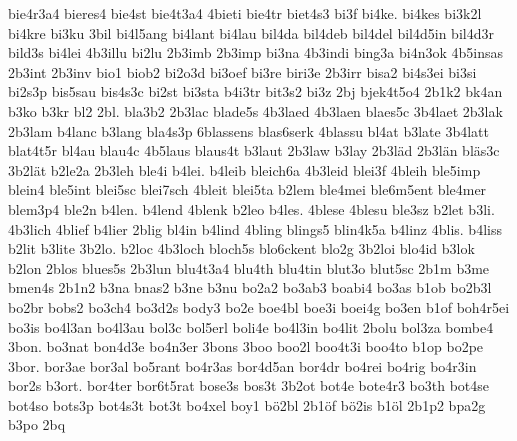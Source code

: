{    bie4r3a4
    bieres4
    bie4st
    bie4t3a4
    4bieti
    bie4tr
    biet4s3
    bi3f
    bi4ke.
    bi4kes
    bi3k2l
    bi4kre
    bi3ku
    3bil
    bi4l5ang
    bi4lant
    bi4lau
    bil4da
    bil4deb
    bil4del
    bil4d5in
    bil4d3r
    bild3s
    bi4lei
    4b3illu
    bi2lu
    2b3imb
    2b3imp
    bi3na
    4b3indi
    bing3a
    bi4n3ok
    4b5insas
    2b3int
    2b3inv
    bio1
    biob2
    bi2o3d
    bi3oef
    bi3re
    biri3e
    2b3irr
    bisa2
    bi4s3ei
    bi3si
    bi2s3p
    bis5sau
    bis4s3c
    bi2st
    bi3sta
    b4i3tr
    bit3s2
    bi3z
    2bj
    bjek4t5o4
    2b1k2
    bk4an
    b3ko
    b3kr
    bl2
    2bl.
    bla3b2
    2b3lac
    blade5s
    4b3laed
    4b3laen
    blaes5c
    3b4laet
    2b3lak
    2b3lam
    b4lanc
    b3lang
    bla4s3p
    6blassens
    blas6serk
    4blassu
    bl4at
    b3late
    3b4latt
    blat4t5r
    bl4au
    blau4c
    4b5laus
    blaus4t
    b3laut
    2b3law
    b3lay
    2b3läd
    2b3län
    bläs3c
    3b2lät
    b2le2a
    2b3leh
    ble4i
    b4lei.
    b4leib
    bleich6a
    4b3leid
    blei3f
    4bleih
    ble5imp
    blein4
    ble5int
    blei5sc
    blei7sch
    4bleit
    blei5ta
    b2lem
    ble4mei
    ble6m5ent
    ble4mer
    blem3p4
    ble2n
    b4len.
    b4lend
    4blenk
    b2leo
    b4les.
    4blese
    4blesu
    ble3sz
    b2let
    b3li.
    4b3lich
    4blief
    b4lier
    2blig
    bl4in
    b4lind
    4bling
    blings5
    blin4k5a
    b4linz
    4blis.
    b4liss
    b2lit
    b3lite
    3b2lo.
    b2loc
    4b3loch
    bloch5s
    blo6ckent
    blo2g
    3b2loi
    blo4id
    b3lok
    b2lon
    2blos
    blues5s
    2b3lun
    blu4t3a4
    blu4th
    blu4tin
    blut3o
    blut5sc
    2b1m
    b3me
    bmen4s
    2b1n2
    b3na
    bnas2
    b3ne
    b3nu
    bo2a2
    bo3ab3
    boabi4
    bo3as
    b1ob
    bo2b3l
    bo2br
    bobs2
    bo3ch4
    bo3d2s
    body3
    bo2e
    boe4bl
    boe3i
    boei4g
    bo3en
    b1of
    boh4r5ei
    bo3is
    bo4l3an
    bo4l3au
    bol3c
    bol5erl
    boli4e
    bo4l3in
    bo4lit
    2bolu
    bol3za
    bombe4
    3bon.
    bo3nat
    bon4d3e
    bo4n3er
    3bons
    3boo
    boo2l
    boo4t3i
    boo4to
    b1op
    bo2pe
    3bor.
    bor3ae
    bor3al
    bo5rant
    bo4r3as
    bor4d5an
    bor4dr
    bo4rei
    bo4rig
    bo4r3in
    bor2s
    b3ort.
    bor4ter
    bor6t5rat
    bose3s
    bos3t
    3b2ot
    bot4e
    bote4r3
    bo3th
    bot4se
    bot4so
    bots3p
    bot4s3t
    bot3t
    bo4xel
    boy1
    bö2bl
    2b1öf
    bö2is
    b1öl
    2b1p2
    bpa2g
    b3po
    2bq
}
